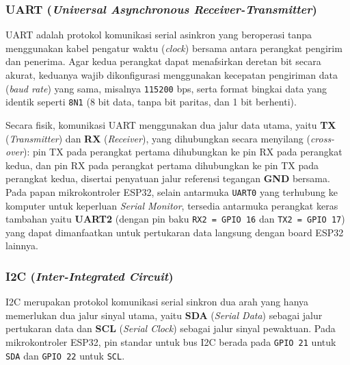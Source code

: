 \subsubsection{UART (\textit{Universal Asynchronous Receiver-Transmitter})}
UART adalah protokol komunikasi serial asinkron yang beroperasi tanpa menggunakan kabel pengatur waktu (\textit{clock}) bersama antara perangkat pengirim dan penerima. Agar kedua perangkat dapat menafsirkan deretan bit secara akurat, keduanya wajib dikonfigurasi menggunakan kecepatan pengiriman data (\textit{baud rate}) yang sama, misalnya \texttt{115200} bps, serta format bingkai data yang identik seperti \texttt{8N1} (8 bit data, tanpa bit paritas, dan 1 bit berhenti).

Secara fisik, komunikasi UART menggunakan dua jalur data utama, yaitu \textbf{TX} (\textit{Transmitter}) dan \textbf{RX} (\textit{Receiver}), yang dihubungkan secara menyilang (\textit{cross-over}): pin TX pada perangkat pertama dihubungkan ke pin RX pada perangkat kedua, dan pin RX pada perangkat pertama dihubungkan ke pin TX pada perangkat kedua, disertai penyatuan jalur referensi tegangan \textbf{GND} bersama. Pada papan mikrokontroler ESP32, selain antarmuka \texttt{UART0} yang terhubung ke komputer untuk keperluan \textit{Serial Monitor}, tersedia antarmuka perangkat keras tambahan yaitu \textbf{UART2} (dengan pin baku \texttt{RX2 = GPIO 16} dan \texttt{TX2 = GPIO 17}) yang dapat dimanfaatkan untuk pertukaran data langsung dengan board ESP32 lainnya.

\subsubsection{I2C (\textit{Inter-Integrated Circuit})}
I2C merupakan protokol komunikasi serial sinkron dua arah yang hanya memerlukan dua jalur sinyal utama, yaitu \textbf{SDA} (\textit{Serial Data}) sebagai jalur pertukaran data dan \textbf{SCL} (\textit{Serial Clock}) sebagai jalur sinyal pewaktuan. Pada mikrokontroler ESP32, pin standar untuk bus I2C berada pada \texttt{GPIO 21} untuk \texttt{SDA} dan \texttt{GPIO 22} untuk \texttt{SCL}.

